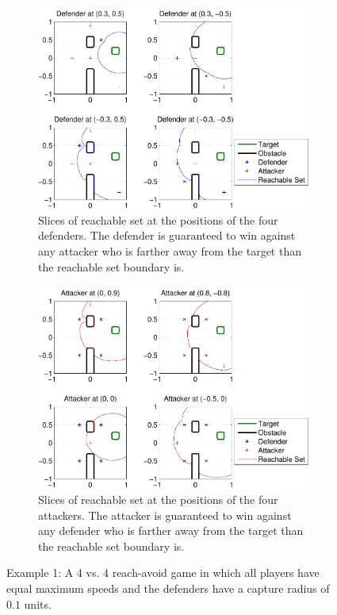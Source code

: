 \begin{figure}[h]
\centering
	\begin{subfigure}{0.45\textwidth}
	\centering
	\includegraphics[width=\textwidth]{"fig/fixed defender 1"}
	\caption{Slices of reachable set at the positions of the four defenders. The defender is guaranteed to win against any attacker who is farther away from the target than the reachable set boundary is.}
	\label{subfig:fixed_d_1}
	\end{subfigure}	
	
	\begin{subfigure}{0.45\textwidth}
	\centering
	\includegraphics[width=\textwidth]{"fig/fixed attacker 1"}
	\caption{Slices of reachable set at the positions of the four attackers. The attacker is guaranteed to win against any defender who is farther away from the target than the reachable set boundary is.}
	\label{subfig:fixed_a_1}
	\end{subfigure}
\caption{Example 1: A 4 vs. 4 reach-avoid game in which all players have equal maximum speeds and the defenders have a capture radius of $0.1$ units.}
\label{fig:results1}
\end{figure}

